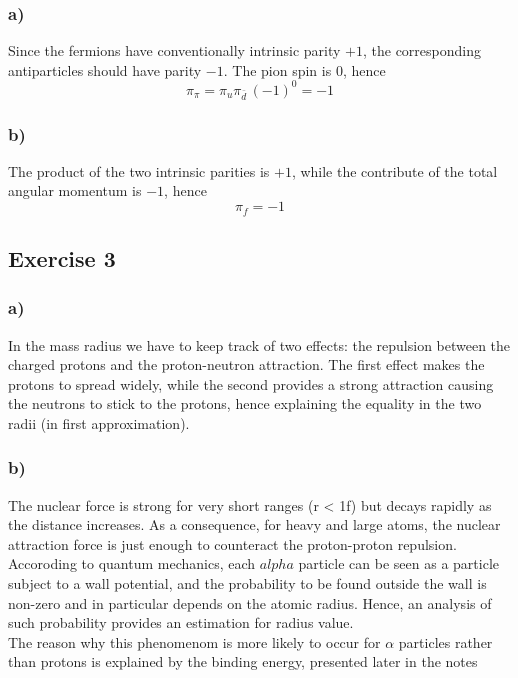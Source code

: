 \subsubsection*{a)}
Since the fermions have conventionally intrinsic parity $+1$, the corresponding antiparticles
should have parity $-1$. The pion spin is $0$, hence
$$\pi_{\pi} = \pi_u \pi_{\bar d} \, (-1)^0 = -1$$

\subsubsection*{b)}
The product of the two intrinsic parities is $+1$, while the contribute of the total angular momentum
is $-1$, hence $$\pi_f = -1$$

\subsection*{Exercise 3}

\subsubsection*{a)}
In the mass radius we have to keep track of two effects: the repulsion between the charged protons and the
proton-neutron attraction. The first effect makes the protons to spread widely, while the second provides
a strong attraction causing the neutrons to stick to the protons, hence explaining the equality in the two 
radii (in first approximation).

\subsubsection*{b)}
The nuclear force is strong for very short ranges (r < 1f) but decays rapidly as the distance increases.
As a consequence, for heavy and large atoms, the nuclear attraction force is just enough to counteract
the proton-proton repulsion. Accoroding to quantum mechanics, each $alpha$ particle can be seen as a
particle subject to a wall potential, and the probability to be found outside the wall is non-zero
and in particular depends on the atomic radius. Hence, an analysis of such probability provides
an estimation for radius value. \\
The reason why this phenomenom is more likely to occur for $\alpha$ particles rather than protons
is explained by the binding energy, presented later in the notes